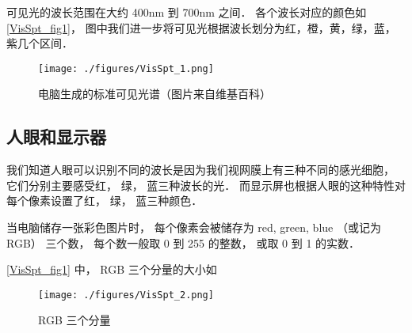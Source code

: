 
可见光的波长范围在大约 400nm 到 700nm 之间． 各个波长对应的颜色如\autoref{VisSpt_fig1}， 图中我们进一步将可见光根据波长划分为红，橙，黄，绿，蓝，紫几个区间．

\begin{figure}[ht]
\centering
\texttt{[image: ./figures/VisSpt\_1.png]}
\caption{电脑生成的标准可见光谱（图片来自维基百科）} \label{VisSpt_fig1}
\end{figure}

\subsection{人眼和显示器}
我们知道人眼可以识别不同的波长是因为我们视网膜上有三种不同的感光细胞， 它们分别主要感受红， 绿， 蓝三种波长的光． 而显示屏也根据人眼的这种特性对每个像素设置了红， 绿， 蓝三种颜色．

当电脑储存一张彩色图片时， 每个像素会被储存为 red, green, blue （或记为 RGB） 三个数， 每个数一般取 0 到 255 的整数， 或取 0 到 1 的实数．

\autoref{VisSpt_fig1} 中， RGB 三个分量的大小如

\begin{figure}[ht]
\centering
\texttt{[image: ./figures/VisSpt\_2.png]}
\caption{RGB 三个分量} \label{VisSpt_fig2}
\end{figure}
